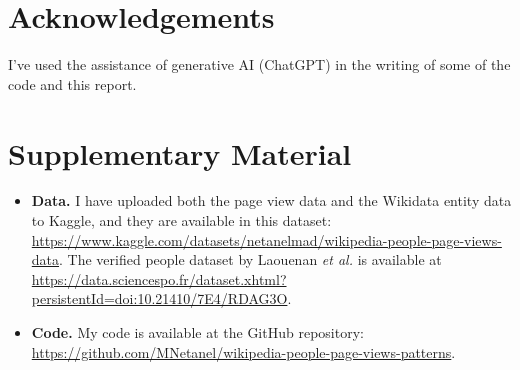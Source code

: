 \documentclass[titlepage]{article}
\begin{document}
\section*{Acknowledgements}
I've used the assistance of generative AI (ChatGPT) in the writing of some of the code and this report.

\section*{Supplementary Material} \label{supplementary}
\begin{itemize}
    \item \textbf{Data.} I have uploaded both the page view data and the Wikidata entity data to Kaggle, and they are available in this dataset: \url{https://www.kaggle.com/datasets/netanelmad/wikipedia-people-page-views-data}. The verified people dataset by Laouenan \textit{et al.} \cite{laouenan_cross-verified_2022} is available at \url{https://data.sciencespo.fr/dataset.xhtml?persistentId=doi:10.21410/7E4/RDAG3O}.
    \item \textbf{Code.} My code is available at the GitHub repository: \url{https://github.com/MNetanel/wikipedia-people-page-views-patterns}.
\end{itemize}


\newpage


\end{document}

